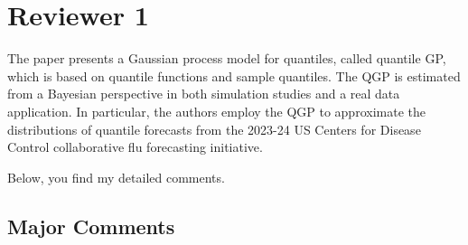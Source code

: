 \documentclass{article}
\begin{document}
  
  
\section*{Reviewer 1}


The paper presents a Gaussian process model for quantiles, called quantile GP, which is based on
quantile functions and sample quantiles. The QGP is estimated from a Bayesian perspective in
both simulation studies and a real data application. In particular, the authors employ the QGP to
approximate the distributions of quantile forecasts from the 2023-24 US Centers for Disease Control
collaborative flu forecasting initiative.


Below, you find my detailed comments.


\subsection*{Major Comments}
\end{document}
